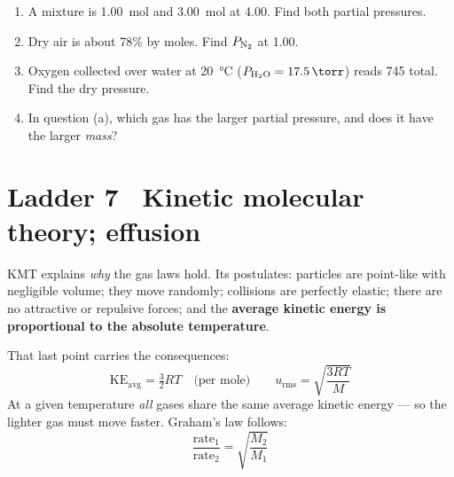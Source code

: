 \documentclass{apchem-worksheet}
\begin{document}
\begin{yourturn}
\begin{enumerate}[leftmargin=*,itemsep=0.5em]
  \item A mixture is \SI{1.00}{\mole}  and \SI{3.00}{\mole}
         at \SI{4.00}{\atm}. Find both partial pressures.
        \workspace[1.6cm]
  \item Dry air is about 78\%  by moles. Find $P_{\ce{N2}}$ at
        \SI{1.00}{\atm}. \workspace[1.4cm]
  \item Oxygen collected over water at \SI{20}{\celsius}
        ($P_{\ce{H2O}} = \SI{17.5}{\torr}$) reads \SI{745}{\torr} total.
        Find the dry  pressure. \workspace[1.4cm]
  \item In question (a), which gas has the larger partial pressure, and
        does it have the larger \emph{mass}? \workspace[1.6cm]
\end{enumerate}
\end{yourturn}

\section*{\sffamily Ladder 7 \textbullet\ Kinetic molecular theory;
effusion}

KMT explains \emph{why} the gas laws hold. Its postulates: particles are
point-like with negligible volume; they move randomly; collisions are
perfectly elastic; there are no attractive or repulsive forces; and the
\textbf{average kinetic energy is proportional to the absolute
temperature}.

That last point carries the consequences:
\[ \mathrm{KE}_{\text{avg}} = \tfrac{3}{2}RT \quad\text{(per mole)}
   \qquad u_{\text{rms}} = \sqrt{\frac{3RT}{M}} \]
At a given temperature \emph{all} gases share the same average kinetic
energy --- so the lighter gas must move faster. Graham's law follows:
\[ \frac{\text{rate}_1}{\text{rate}_2} = \sqrt{\frac{M_2}{M_1}} \]
\end{document}
